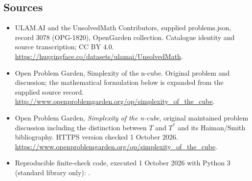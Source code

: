 \documentclass[11pt,a4paper]{article}
\begin{document}
\subsection{Sources}
\begin{itemize}
\item[S1] ULAM.AI and the UnsolvedMath Contributors, supplied problems.json, record 3078 (OPG-1820), OpenGarden collection. Catalogue identity and source transcription; CC BY 4.0.
\url{https://huggingface.co/datasets/ulamai/UnsolvedMath}.
\item[S2] Open Problem Garden, Simplexity of the n-cube. Original problem and discussion; the mathematical formulation below is expanded from the supplied source record.
\url{http://www.openproblemgarden.org/op/simplexity_of_the_cube}.
\item[S3] Open Problem Garden, \emph{Simplexity of the n-cube}, original maintained problem discussion including the distinction between $T$ and $T^*$ and its Haiman/Smith bibliography. HTTPS version checked 1 October 2026.
\url{https://www.openproblemgarden.org/op/simplexity_of_the_cube}.
\item[C1] Reproducible finite-check code, executed 1 October 2026 with Python 3 (standard library only):
.
\end{itemize}
\end{document}
